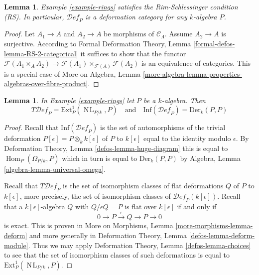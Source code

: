 \documentclass{stacks-project}
\theoremstyle{plain}
\newtheorem{lemma}[subsection]{Lemma}
\theoremstyle{definition}
\theoremstyle{remark}
\numberwithin{equation}{subsection}
\def\Hom{\mathop{\mathrm{Hom}}\nolimits}
\def\NL{\mathop{N\!L}\nolimits}
\def\Deformationcategory{\mathcal{D}\!\mathit{ef}}
\begin{document}
\begin{lemma}
\label{lemma-rings-RS}
Example \ref{example-rings}
satisfies the Rim-Schlessinger condition (RS).
In particular, $\Deformationcategory_P$ is a deformation category
for any $k$-algebra $P$.
\end{lemma}

\begin{proof}
Let $A_1 \to A$ and $A_2 \to A$ be morphisms of $\mathcal{C}_\Lambda$.
Assume $A_2 \to A$ is surjective. According to
Formal Deformation Theory, Lemma
\ref{formal-defos-lemma-RS-2-categorical}
it suffices to show that the functor
$\mathcal{F}(A_1 \times_A A_2) \to
\mathcal{F}(A_1) \times_{\mathcal{F}(A)} \mathcal{F}(A_2)$
is an equivalence of categories.
This is a special case of More on Algebra, Lemma
\ref{more-algebra-lemma-properties-algebras-over-fibre-product}.
\end{proof}

\begin{lemma}
\label{lemma-rings-TI}
In Example \ref{example-rings} let $P$ be a $k$-algebra. Then
$$
T\Deformationcategory_P = \text{Ext}^1_P(\NL_{P/k}, P)
\quad\text{and}\quad
\text{Inf}(\Deformationcategory_P) = \text{Der}_k(P, P)
$$
\end{lemma}

\begin{proof}
Recall that $\text{Inf}(\Deformationcategory_P)$ is the set of
automorphisms of the trivial deformation
$P[\epsilon] = P \otimes_k k[\epsilon]$ of $P$ to $k[\epsilon]$
equal to the identity modulo $\epsilon$.
By Deformation Theory, Lemma \ref{defos-lemma-huge-diagram}
this is equal to $\Hom_P(\Omega_{P/k}, P)$ which in turn is
equal to $\text{Der}_k(P, P)$ by
Algebra, Lemma \ref{algebra-lemma-universal-omega}.

\medskip\noindent
Recall that $T\Deformationcategory_P$ is the set of isomorphism classes
of flat deformations $Q$ of $P$ to $k[\epsilon]$, more precisely,
the set of isomorphism classes of $\Deformationcategory_P(k[\epsilon])$.
Recall that a $k[\epsilon]$-algebra $Q$ with $Q/\epsilon Q = P$
is flat over $k[\epsilon]$ if and only if
$$
0 \to P \xrightarrow{\epsilon} Q \to P \to 0
$$
is exact. This is proven in More on Morphisms, Lemma
\ref{more-morphisms-lemma-deform} and more generally in
Deformation Theory, Lemma \ref{defos-lemma-deform-module}.
Thus we may apply
Deformation Theory, Lemma \ref{defos-lemma-choices}
to see that the set of isomorphism classes of such
deformations is equal to $\text{Ext}^1_P(\NL_{P/k}, P)$.
\end{proof}
\end{document}
